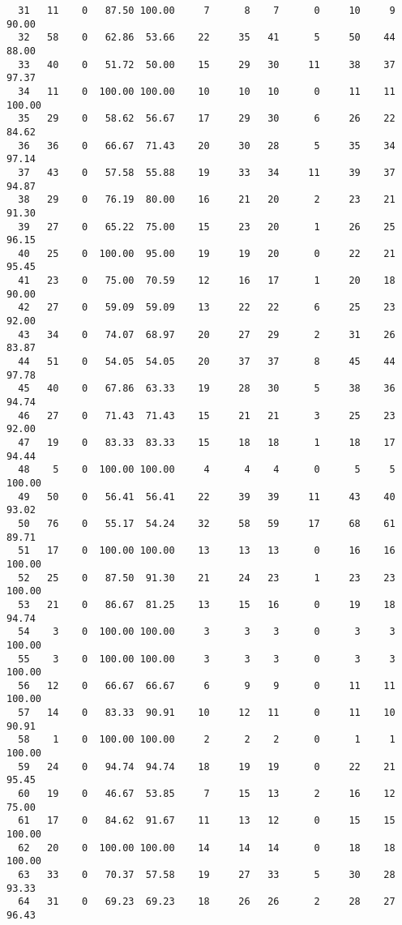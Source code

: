 \begin{verbatim}
  31   11    0   87.50 100.00     7      8    7      0     10     9    90.00
  32   58    0   62.86  53.66    22     35   41      5     50    44    88.00
  33   40    0   51.72  50.00    15     29   30     11     38    37    97.37
  34   11    0  100.00 100.00    10     10   10      0     11    11   100.00
  35   29    0   58.62  56.67    17     29   30      6     26    22    84.62
  36   36    0   66.67  71.43    20     30   28      5     35    34    97.14
  37   43    0   57.58  55.88    19     33   34     11     39    37    94.87
  38   29    0   76.19  80.00    16     21   20      2     23    21    91.30
  39   27    0   65.22  75.00    15     23   20      1     26    25    96.15
  40   25    0  100.00  95.00    19     19   20      0     22    21    95.45
  41   23    0   75.00  70.59    12     16   17      1     20    18    90.00
  42   27    0   59.09  59.09    13     22   22      6     25    23    92.00
  43   34    0   74.07  68.97    20     27   29      2     31    26    83.87
  44   51    0   54.05  54.05    20     37   37      8     45    44    97.78
  45   40    0   67.86  63.33    19     28   30      5     38    36    94.74
  46   27    0   71.43  71.43    15     21   21      3     25    23    92.00
  47   19    0   83.33  83.33    15     18   18      1     18    17    94.44
  48    5    0  100.00 100.00     4      4    4      0      5     5   100.00
  49   50    0   56.41  56.41    22     39   39     11     43    40    93.02
  50   76    0   55.17  54.24    32     58   59     17     68    61    89.71
  51   17    0  100.00 100.00    13     13   13      0     16    16   100.00
  52   25    0   87.50  91.30    21     24   23      1     23    23   100.00
  53   21    0   86.67  81.25    13     15   16      0     19    18    94.74
  54    3    0  100.00 100.00     3      3    3      0      3     3   100.00
  55    3    0  100.00 100.00     3      3    3      0      3     3   100.00
  56   12    0   66.67  66.67     6      9    9      0     11    11   100.00
  57   14    0   83.33  90.91    10     12   11      0     11    10    90.91
  58    1    0  100.00 100.00     2      2    2      0      1     1   100.00
  59   24    0   94.74  94.74    18     19   19      0     22    21    95.45
  60   19    0   46.67  53.85     7     15   13      2     16    12    75.00
  61   17    0   84.62  91.67    11     13   12      0     15    15   100.00
  62   20    0  100.00 100.00    14     14   14      0     18    18   100.00
  63   33    0   70.37  57.58    19     27   33      5     30    28    93.33
  64   31    0   69.23  69.23    18     26   26      2     28    27    96.43

\end{verbatim}
